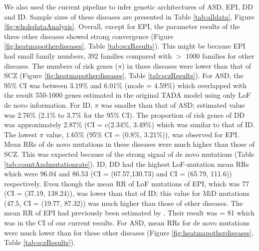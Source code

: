 \documentclass[]{article}
\begin{document}
We also used the current pipeline to infer genetic architectures of
ASD, EPI, DD and ID. Sample sizes of these diseases are presented in
Table \ref{tab:alldata}, Figure \ref{fig:wholedataAnalysis}. Overall, except for EPI, the parameter results of the three other
diseases showed strong convergence (Figure
\ref{fig:heatmapotherdiseases}, Table \ref{tab:sczResults}). This
might be because EPI had small family numbers, 392 families compared with $>$
1000 families for other diseases.
The numbers of risk genes ($\pi$) in these diseases were lower
than that of SCZ (Figure \ref{fig:heatmapotherdiseases}, Table \ref{tab:sczResults}).
For ASD, the $95\%$ CI was between
3.19$\%$ and 6.01$\%$ (mode = 4.59$\%$) which overlapped with the result 550-1000 genes estimated in
the original TADA model \citep{he2013integrated} using only LoF de
novo information. For ID, $\pi$ was
smaller than that of ASD; estimated value was 2.76$\%$ (2.1$\%$ to
3.7$\%$ for the 95$\%$ CI). The proportion of risk genes of DD was approximately 2.87$\%$ (CI = c(2.34$\%$, 3.49$\%$) which was similar to that of ID.
The lowest $\pi$ value, $1.65\%$ (95$\%$ CI
= (0.8$\%$, 3.21$\%$)), was observed for EPI. Mean RRs of de
novo mutations in these diseases were much higher than those of
SCZ. This was expected because of the strong signal of de novo mutations
(Table \ref{tab:countAndmutationrate}).
ID, DD had the highest LoF-mutation mean RRs which were 96.04 and
86.53 (CI = (67.57,130.73) and CI = (65.79, 111.6)) respectively. Even though the mean RR of LoF mutations of EPI, which was
77 (CI = (37.19, 138.24)),  was lower
than that of ID; this value for MiD mutations (47.5, CI = (19.77,
87.32)) was much higher than those of other diseases. The mean RR of
EPI had previously been estimated by \cite{phenome2013novo}. Their
result was = 81 which was in the CI of our current results.
For ASD, mean RRs for
de novo mutations were much lower than for these other diseases (Figure
\ref{fig:heatmapotherdiseases}, Table \ref{tab:sczResults}).
\end{document}
